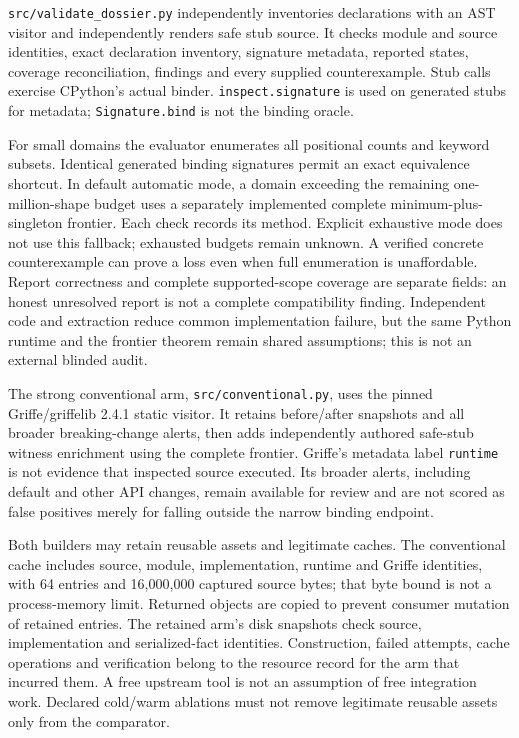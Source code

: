 \documentclass[11pt,letterpaper]{article}
\begin{document}
\texttt{src/validate\_dossier.py} independently inventories declarations with
an AST visitor and independently renders safe stub source. It checks module
and source identities, exact declaration inventory, signature metadata,
reported states, coverage reconciliation, findings and every supplied
counterexample. Stub calls exercise CPython's actual binder.
\texttt{inspect.signature} is used on generated stubs for metadata;
\texttt{Signature.bind} is not the binding oracle.

For small domains the evaluator enumerates all positional counts and
keyword subsets. Identical generated binding signatures permit an exact
equivalence shortcut. In default automatic mode, a domain exceeding the
remaining one-million-shape budget uses a separately implemented complete
minimum-plus-singleton frontier. Each check records its method. Explicit
exhaustive mode does not use this fallback; exhausted budgets remain unknown.
A verified concrete counterexample can prove a loss even when full
enumeration is unaffordable. Report correctness and complete supported-scope
coverage are separate fields: an honest unresolved report is not a complete
compatibility finding. Independent code and extraction reduce common
implementation failure, but the same Python runtime and the frontier
theorem remain shared assumptions; this is not an external blinded audit.

The strong conventional arm, \texttt{src/conventional.py}, uses the pinned
Griffe/griffelib 2.4.1 static visitor. It retains before/after snapshots and
all broader breaking-change alerts, then adds independently authored
safe-stub witness enrichment using the complete frontier. Griffe's metadata
label \texttt{runtime} is not evidence that inspected source executed.
Its broader alerts, including default and other API changes, remain available
for review and are not scored as false positives merely for falling outside
the narrow binding endpoint.

Both builders may retain reusable assets and legitimate caches. The
conventional cache includes source, module, implementation, runtime and
Griffe identities, with 64 entries and 16,000,000 captured source bytes;
that byte bound is not a process-memory limit. Returned objects are copied
to prevent consumer mutation of retained entries. The retained arm's disk
snapshots check source, implementation and serialized-fact identities.
Construction, failed attempts, cache operations and verification belong to
the resource record for the arm that incurred them. A free upstream tool is
not an assumption of free integration work. Declared cold/warm ablations
must not remove legitimate reusable assets only from the comparator.
\end{document}
